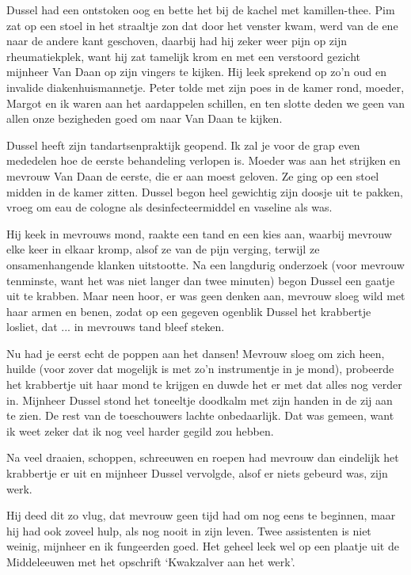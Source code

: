 \documentclass{book}
\begin{document}
Dussel had een ontstoken oog en bette het bij de kachel met kamillen-thee. Pim
zat op een stoel in het straaltje zon dat door het venster kwam, werd van de ene
naar de andere kant geschoven, daarbij had hij zeker weer pijn op zijn
rheumatiekplek, want hij zat tamelijk krom en met een verstoord gezicht mijnheer
Van Daan op zijn vingers te kijken. Hij leek sprekend op zo'n oud en invalide
diakenhuismannetje.  Peter tolde met zijn poes in de kamer rond, moeder, Margot
en ik waren aan het aardappelen schillen, en ten slotte deden we geen van allen
onze bezigheden goed om naar Van Daan te kijken.

Dussel heeft zijn tandartsenpraktijk geopend. Ik zal je voor de grap even
mededelen hoe de eerste behandeling verlopen is. Moeder was aan het strijken en
mevrouw Van Daan de eerste, die er aan moest geloven. Ze ging op een stoel
midden in de kamer zitten. Dussel begon heel gewichtig zijn doosje uit te
pakken, vroeg om eau de cologne als desinfecteermiddel en vaseline als was.

Hij keek in mevrouws mond, raakte een tand en een kies aan, waarbij mevrouw elke
keer in elkaar kromp, alsof ze van de pijn verging, terwijl ze onsamenhangende
klanken uitstootte. Na een langdurig onderzoek (voor mevrouw tenminste, want het
was niet langer dan twee minuten) begon Dussel een gaatje uit te krabben. Maar
neen hoor, er was geen denken aan, mevrouw sloeg wild met haar armen en benen,
zodat op een gegeven ogenblik Dussel het krabbertje losliet, dat ... in mevrouws
tand bleef steken.

Nu had je eerst echt de poppen aan het dansen! Mevrouw sloeg om zich heen,
huilde (voor zover dat mogelijk is met zo'n instrumentje in je mond), probeerde
het krabbertje uit haar mond te krijgen en duwde het er met dat alles nog verder
in. Mijnheer Dussel stond het toneeltje doodkalm met zijn handen in de zij aan
te zien. De rest van de toeschouwers lachte onbedaarlijk. Dat was gemeen, want
ik weet zeker dat ik nog veel harder gegild zou hebben.

Na veel draaien, schoppen, schreeuwen en roepen had mevrouw dan eindelijk het
krabbertje er uit en mijnheer Dussel vervolgde, alsof er niets gebeurd was, zijn
werk.

Hij deed dit zo vlug, dat mevrouw geen tijd had om nog eens te beginnen, maar
hij had ook zoveel hulp, als nog nooit in zijn leven. Twee assistenten is niet
weinig, mijnheer en ik fungeerden goed. Het geheel leek wel op een plaatje uit
de Middeleeuwen met het opschrift `Kwakzalver aan het werk'.
\end{document}
